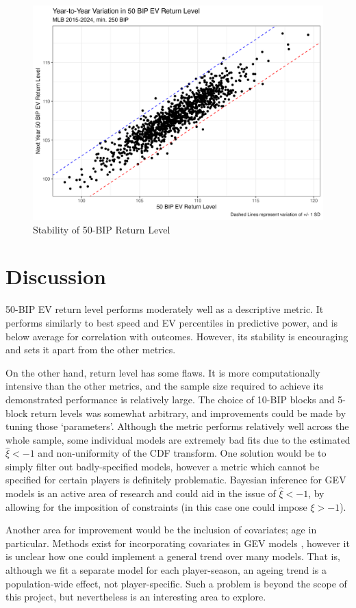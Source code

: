 \documentclass[12pt, TexShade, letterpaper]{report}
\begin{document}
\begin{figure}[hb]
    \centering
    \includegraphics[width=0.7\linewidth]{plots/return_level_stability.png}
    \caption{Stability of 50-BIP Return Level}
    \label{fig:stability}
\end{figure}

\section{Discussion}
50-BIP EV return level performs moderately well as a descriptive metric. It performs similarly to best speed and EV percentiles in predictive power, and is below average for correlation with outcomes. However, its stability is encouraging and sets it apart from the other metrics.

On the other hand, return level has some flaws. It is more computationally intensive than the other metrics, and the sample size required to achieve its demonstrated performance is relatively large. The choice of 10-BIP blocks and 5-block return levels was somewhat arbitrary, and improvements could be made by tuning those `parameters'. Although the metric performs relatively well across the whole sample, some individual models are extremely bad fits due to the estimated $\hat{\xi} < -1$ and non-uniformity of the CDF transform. One solution would be to simply filter out badly-specified models, however a metric which cannot be specified for certain players is definitely problematic. Bayesian inference for GEV models is an active area of research and could aid in the issue of $\hat{\xi} < -1$, by allowing for the imposition of constraints (in this case one could impose $\xi > -1$).

Another area for improvement would be the inclusion of covariates; age in particular. Methods exist for incorporating covariates in GEV models \cite{coles}, however it is unclear how one could implement a general trend over many models. That is, although we fit a separate model for each player-season, an ageing trend is a population-wide effect, not player-specific. Such a problem is beyond the scope of this project, but nevertheless is an interesting area to explore.
\end{document}
